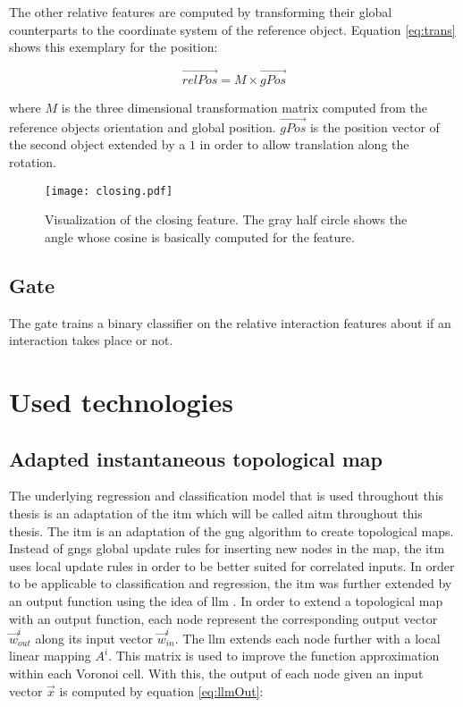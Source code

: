 The other relative features are computed by transforming their global counterparts to the coordinate system of the reference object. Equation \ref{eq:trans} shows this exemplary for the position:

\begin{equation}
	\vec{relPos} = M \times \vec{gPos}
\label{eq:trans}
\end{equation}

where $M$ is the three dimensional transformation matrix computed from the reference objects orientation and global position. $\vec{gPos}$ is the position vector of the second object extended by a $1$ in order to allow translation along the rotation. 

\begin{figure}
	\centering
	\texttt{[image: closing.pdf]}
	\caption{Visualization of the closing feature. The gray half circle shows the angle whose cosine is basically computed for the feature.} 
	\label{fig:closing}
\end{figure}

\subsection{Gate}

The gate trains a binary classifier on the relative interaction features about if an interaction takes place or not. 



\section{Used technologies \label{sec:technologies}}

\subsection{Adapted instantaneous topological map \label{sec:ITM}}
The underlying regression and classification model that is used throughout this thesis is an adaptation of the \acrfull{itm} which will be called \acrfull{aitm} throughout this thesis.
The \gls{itm} \cite{itm} is an adaptation of the \gls{gng} \cite{gng} algorithm to create topological maps. Instead of \glspl{gng} global update rules for inserting new nodes in the map, the \gls{itm} uses local update rules in order to be better suited for correlated inputs. 
In order to be applicable to classification and regression, the \gls{itm} was further extended by an output function using the idea of \gls{llm} \cite{LLM}. In order to extend a topological map with an output function, each node represent the corresponding output vector $\vec{w}^i_{out}$ along its input vector $\vec{w}^i_{in}$. The \gls{llm} extends each node further with a local linear mapping $A^i$. This matrix is used to improve the function approximation within each Voronoi cell. With this, the output of each node given an input vector $\vec{x}$ is computed by equation \ref{eq:llmOut}:

